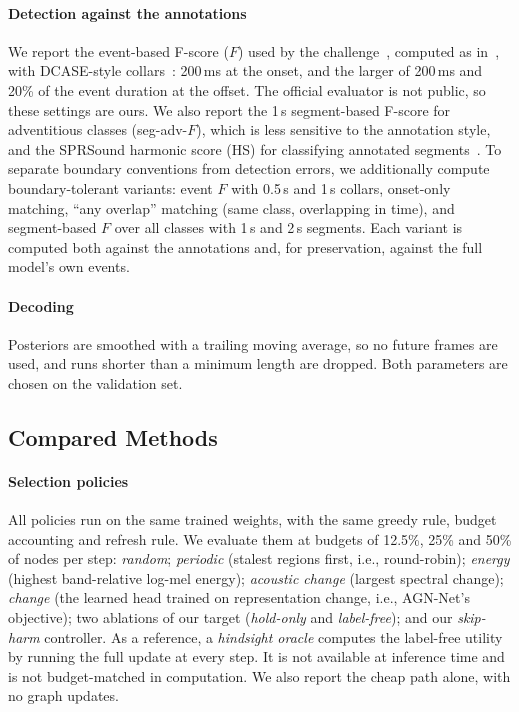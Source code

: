 \paragraph*{Detection against the annotations} We report the event-based F-score ($F$) used by the challenge~\cite{zhang2024meta}, computed as in~\cite{mesaros2016metrics}, with DCASE-style collars~\cite{turpault2019sound}: 200\,ms at the onset, and the larger of 200\,ms and 20\% of the event duration at the offset. The official evaluator is not public, so these settings are ours. We also report the 1\,s segment-based F-score for adventitious classes (seg-adv-$F$), which is less sensitive to the annotation style, and the SPRSound harmonic score (HS) for classifying annotated segments~\cite{zhang2022grand}. To separate boundary conventions from detection errors, we additionally compute boundary-tolerant variants: event $F$ with 0.5\,s and 1\,s collars, onset-only matching, ``any overlap'' matching (same class, overlapping in time), and segment-based $F$ over all classes with 1\,s and 2\,s segments. Each variant is computed both against the annotations and, for preservation, against the full model's own events.

\paragraph*{Decoding} Posteriors are smoothed with a trailing moving average, so no future frames are used, and runs shorter than a minimum length are dropped. Both parameters are chosen on the validation set.

\subsection{Compared Methods}
\label{sec:policies}
\paragraph*{Selection policies} All policies run on the same trained weights, with the same greedy rule, budget accounting and refresh rule. We evaluate them at budgets of 12.5\%, 25\% and 50\% of nodes per step:
\emph{random}; \emph{periodic} (stalest regions first, i.e., round-robin); \emph{energy} (highest band-relative log-mel energy); \emph{acoustic change} (largest spectral change); \emph{change} (the learned head trained on representation change, i.e., AGN-Net's objective); two ablations of our target (\emph{hold-only} and \emph{label-free}); and our \emph{skip-harm} controller. As a reference, a \emph{hindsight oracle} computes the label-free utility by running the full update at every step. It is not available at inference time and is not budget-matched in computation. We also report the cheap path alone, with no graph updates.

